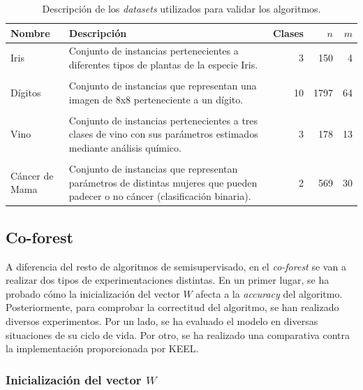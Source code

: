 \begin{table}
	\small
	\begin{centering}
		\begin{tabular}{@{}p{4em} p{20em} r r r @{}}
			\toprule
			\textbf{Nombre} & \textbf{Descripción} & \textbf{Clases} & $n$ & $m$\\ 
			\midrule
			
			Iris & Conjunto de instancias pertenecientes a diferentes tipos de plantas de la especie Iris. & 3 & 150 & 4 \\\\
			Dígitos & Conjunto de instancias que representan una imagen de 8x8 perteneciente a un dígito. & 10 & 1797 & 64 \\\\
			Vino & Conjunto de instancias pertenecientes a tres clases de vino con sus parámetros estimados mediante análisis químico. & 3 & 178 & 13 \\\\
			Cáncer de Mama & Conjunto de instancias que representan parámetros de distintas mujeres que pueden padecer o no cáncer (clasificación binaria). & 2 & 569 & 30 \\
			\bottomrule
		\end{tabular}
	\end{centering}
	\caption[Experimentación: \textit{datasets} estándar]{Descripción de los \textit{datasets} utilizados para validar los algoritmos.}
	\label{tabla_datasets_sklearn}	
\end{table}



\subsection{Co-forest}

A diferencia del resto de algoritmos de semisupervisado, en el \textit{co-forest} se van a realizar dos tipos de experimentaciones distintas. En un primer lugar, se ha probado cómo la inicialización del vector $W$ afecta a la \textit{accuracy} del algoritmo. Posteriormente, para comprobar la correctitud del algoritmo, se han realizado diversos experimentos. Por un lado, se ha evaluado el modelo en diversas situaciones de su ciclo de vida. Por otro, se ha realizado una comparativa contra la implementación proporcionada por KEEL.


\subsubsection{Inicialización del vector $W$}
\label{s-experimentacion-w-cof}

